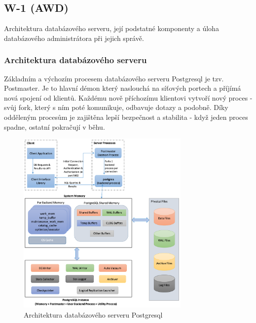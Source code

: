 \subsection{W-1 (AWD)}
Architektura databázového serveru, její podstatné komponenty a úloha databázového administrátora při jejich správě.

\subsubsection{Architektura databázového serveru}
Základním a výchozím procesem databázového serveru Postgresql je tzv. Postmaster. Je to hlavní démon který naslouchá na síťových portech a příjímá nová spojení od klientů. Každému nově příchozímu klientovi vytvoří nový proces - svůj fork, který s ním poté komunikuje, odbavuje dotazy a podobně. Díky odděleným procesům je zajištěna lepší bezpečnost a stabilita - když jeden proces spadne, ostatní pokračují v běhu. 

\begin{figure}[H]
    \centering
    \includegraphics[width=0.75\textwidth]{img/postgresql_architecture.png}
    \caption{Architektura databázového serveru Postgresql}
\end{figure}

